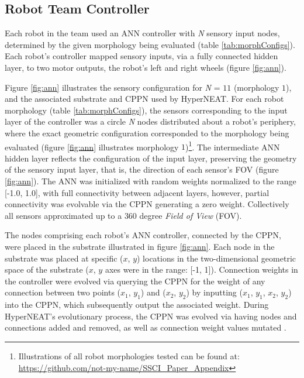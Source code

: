 \documentclass[conference]{IEEEtran}
\begin{document}
\subsection{Robot Team Controller}\label{sec:embodiment}
Each robot in the team used an ANN controller with
\textit{N} sensory input nodes, determined by the given morphology being evaluated (table \ref{tab:morphConfigs}).
Each robot's controller mapped sensory inputs, via a fully connected hidden layer, to two motor outputs, the
robot's left and right wheels (figure \ref{fig:ann}). %

Figure \ref{fig:ann} illustrates the sensory configuration for \textit{N} = $11$ (morphology $1$), and the
associated substrate and CPPN used by HyperNEAT.
For each robot morphology (table \ref{tab:morphConfigs}), the sensors corresponding to the input layer
of the controller was a circle \textit{N} nodes distributed about a robot's periphery,
where the exact geometric configuration corresponded to the morphology being evaluated
(figure \ref{fig:ann} illustrates morphology
$1$)\footnote{Illustrations of all robot morphologies tested can be found at: \url{https://github.com/not-my-name/SSCI_Paper_Appendix}}.
The intermediate ANN hidden layer reflects the configuration of the input layer, preserving
the geometry of the sensory input layer, that is, the direction of each sensor's FOV (figure
\ref{fig:ann}).
The ANN was initialized with random weights normalized to the range [-1.0, 1.0], with full connectivity between adjacent layers,
however, partial connectivity was evolvable via the CPPN generating a zero weight.
Collectively all sensors approximated up to a $360$ degree \textit{Field of View} (FOV).

The nodes comprising each robot's ANN controller, connected by the CPPN, were placed in the substrate
illustrated in figure \ref{fig:ann}.
Each node in the substrate was placed at specific ($x$, $y$) locations in the two-dimensional geometric space
of the substrate ($x$, $y$ axes were in the range: [-1, 1]).
Connection weights in the controller were evolved via querying the CPPN for the weight of any connection
between two points ($x_{1}$, $y_{1}$) and ($x_{2}$, $y_{2}$) by inputting ($x_{1}$, $y_{1}$, $x_{2}$, $y_{2}$)
into the CPPN, which subsequently output the associated weight.
During HyperNEAT's evolutionary process, the CPPN was evolved via having nodes and connections added and removed, as well
as connection weight values mutated \cite{StanleyDAmbrosioGauci2009}.
\end{document}
